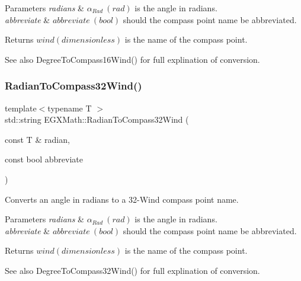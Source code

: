 \begin{DoxyParams}{Parameters}
{\em radians} & $\alpha_{Rad}\ (rad)$ is the angle in radians. \\
\hline
{\em abbreviate} & $abbreviate\ (bool)$ should the compass point name be abbreviated. \\
\hline
\end{DoxyParams}
\begin{DoxyReturn}{Returns}
$wind (dimensionless)$ is the name of the compass point. 
\end{DoxyReturn}
\begin{DoxySeeAlso}{See also}
Degree\+To\+Compass16\+Wind() for full explination of conversion. 
\end{DoxySeeAlso}
\mbox{\label{group___e_g_x_math-_angle_conversions_ga64587b5f303e1921ab34bc344b5089bb}} 
\subsubsection{\texorpdfstring{Radian\+To\+Compass32\+Wind()}{RadianToCompass32Wind()}}
{\footnotesize\ttfamily template$<$typename T $>$ \\
std\+::string E\+G\+X\+Math\+::\+Radian\+To\+Compass32\+Wind (\begin{DoxyParamCaption}\item[{const T \&}]{radian,  }\item[{const bool}]{abbreviate }\end{DoxyParamCaption})}



Converts an angle in radians to a 32-\/\+Wind compass point name. 


\begin{DoxyParams}{Parameters}
{\em radians} & $\alpha_{Rad}\ (rad)$ is the angle in radians. \\
\hline
{\em abbreviate} & $abbreviate\ (bool)$ should the compass point name be abbreviated. \\
\hline
\end{DoxyParams}
\begin{DoxyReturn}{Returns}
$wind (dimensionless)$ is the name of the compass point. 
\end{DoxyReturn}
\begin{DoxySeeAlso}{See also}
Degree\+To\+Compass32\+Wind() for full explination of conversion. 
\end{DoxySeeAlso}
\mbox{\label{group___e_g_x_math-_angle_conversions_ga3c06a01860f69bcd57fab918037318b3}} 
